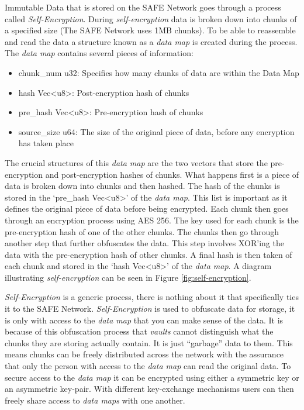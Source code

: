 
Immutable Data that is stored on the SAFE Network goes through a process called \textit{Self-Encryption}\cite{irvine2010self}. During \textit{self-encryption} data is broken down into chunks of a specified size (The SAFE Network uses 1MB chunks). To be able to reassemble and read the data a structure known as a \textit{data map} is created during the process. The \textit{data map} contains several pieces of information:

\begin{itemize}
	\item chunk\_num u32: Specifies how many chunks of data are within the Data Map
	\item hash Vec\textless u8\textgreater: Post-encryption hash of chunks
	\item pre\_hash Vec\textless u8\textgreater: Pre-encryption hash of chunks
	\item source\_size u64: The size of the original piece of data, before any encryption has taken place
\end{itemize}

The crucial structures of this \textit{data map} are the two vectors that store the pre-encryption and post-encryption hashes of chunks. What happens first is a piece of data is broken down into chunks and then hashed. The hash of the chunks is stored in the `pre\_hash Vec\textless u8\textgreater' of the \textit{data map}. This list is important as it defines the original piece of data before being encrypted. Each chunk then goes through an encryption process using AES 256. The key used for each chunk is the pre-encryption hash of one of the other chunks. The chunks then go through another step that further obfuscates the data. This step involves XOR'ing the data with the pre-encryption hash of other chunks. A final hash is then taken of each chunk and stored in the `hash Vec\textless u8\textgreater' of the \textit{data map}. A diagram illustrating \textit{self-encryption} can be seen in Figure \ref{fig:self-encryption}.

\textit{Self-Encryption} is a generic process, there is nothing about it that specifically ties it to the SAFE Network. \textit{Self-Encryption} is used to obfuscate data for storage, it is only with access to the \textit{data map} that you can make sense of the data. It is because of this obfuscation process that \textit{vaults} cannot distinguish what the chunks they are storing actually contain. It is just ``garbage'' data to them. This means chunks can be freely distributed across the network with the assurance that only the person with access to the \textit{data map} can read the original data. To secure access to the \textit{data map} it can be encrypted using either a symmetric key or an asymmetric key-pair. With different key-exchange mechanisms users can then freely share access to \textit{data maps} with one another.

